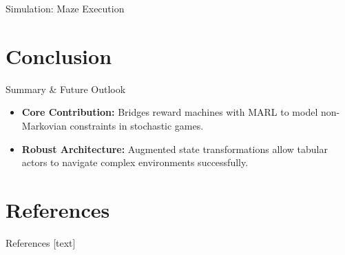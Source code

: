 \documentclass[10pt, aspectratio=169]{beamer}
\begin{document}
\begin{frame}{Simulation: Maze Execution}
    \centering
\end{frame}

\section{Conclusion}

\begin{frame}{Summary \& Future Outlook}
    \begin{itemize}
        \item \textbf{Core Contribution:} Bridges reward machines with MARL to model non-Markovian constraints in stochastic games.
        \item \textbf{Robust Architecture:} Augmented state transformations allow tabular actors to navigate complex environments successfully.
    \end{itemize}
\end{frame}

\section{References}
\begin{frame}[allowframebreaks]{References}
    [text] %
    \nocite{*}
    
\end{frame}
\end{document}
